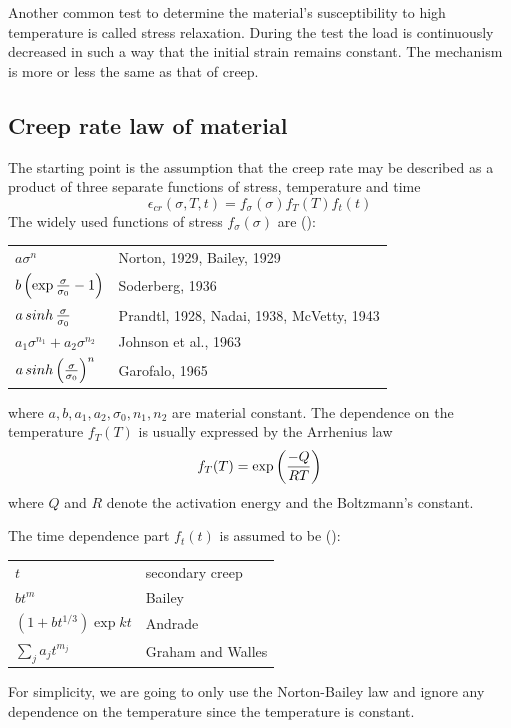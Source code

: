 \documentclass[10pt]{article}
\begin{document}
Another common test to determine the material's susceptibility to high temperature is called stress relaxation. During the test the load is continuously decreased in such a way that the initial strain remains constant. The mechanism is more or less the same as that of creep.

\subsection{Creep rate law of material}
\label{sec:Creep}
The starting point is the assumption that the creep rate may be described as a product of three separate functions of stress, temperature and time
\[
\epsilon_{cr}(\sigma,T,t)=f_\sigma (\sigma) f_T(T) f_t(t)
\]
The widely used functions of stress $f_\sigma(\sigma)$ are (\cite{Creep}):

\begin{tabular}{ll}
$a\sigma^n$ & Norton, 1929, Bailey, 1929 \\
$b\left( \exp{\sigma\over \sigma_0} -1 \right)$ & Soderberg, 1936 \\
$a\mathop{sinh}{\sigma\over \sigma_0}$ & Prandtl, 1928, Nadai, 1938, McVetty, 1943\\
$a_1\sigma^{n_1} + a_2 \sigma^{n_2}$ & Johnson et al., 1963 \\
$a\mathop{sinh} \left( {\sigma\over \sigma_0}\right)^n$ & Garofalo, 1965
\end{tabular}

where $a,b,a_1,a_2,\sigma_0,n_1,n_2$ are material constant. The dependence on the temperature $f_T(T)$ is usually expressed by the Arrhenius law
\[
f_T(T) = \exp \left( {-Q\over RT}\right)
\]
where $Q$ and $R$ denote the activation energy and the Boltzmann's constant.

The time dependence part $f_t(t)$ is assumed to be (\cite{Ch2000}):

\begin{tabular}{ll}
$t$ & secondary creep \\
$bt^m$ & Bailey \\
$(1+bt^{1/3})\exp{kt}$ & Andrade\\
$\sum_j a_j t^{m_j}$ & Graham and Walles
\end{tabular}

For simplicity, we are going to only use the Norton-Bailey law and ignore any dependence on the temperature since the temperature is constant.
\end{document}
